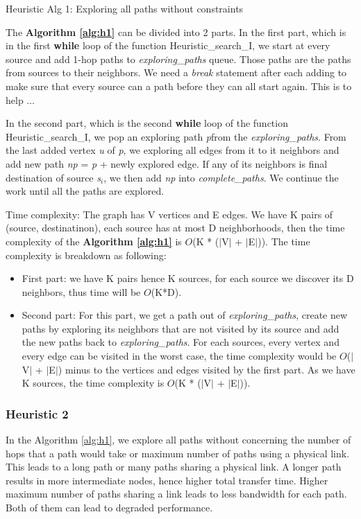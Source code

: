 \begin{algorithm}[!htp]
\caption{Heuristic Alg 1: Exploring all paths without constraints}
\label{alg:h1}

\end{algorithm}

The \textbf{Algorithm \ref{alg:h1}} can be divided into 2 parts. In the first part, which is in the first \textbf{while} loop of the function Heuristic\_search\_I, we start at every source and add 1-hop paths to \textit{exploring\_paths} queue. Those paths are the paths from sources to their neighbors. We need a \textit{break} statement after each adding to make sure that every source can a path before they can all start again. This is to help ...

In the second part, which is the second \textbf{while} loop of the function Heuristic\_search\_I, we pop an exploring path \textit{p}from the \textit{exploring\_paths}. From the last added vertex \textit{u} of \textit{p}, we exploring all edges from it to it neighbors and add new path \textit{np} = \textit{p} + newly explored edge. If any of its neighbors is final destination of source \textit{s$_i$}, we then add \textit{np} into \textit{complete\_paths}. We continue the work until all the paths are explored.

Time complexity: The graph has V vertices and E edges. We have K pairs of (source, destinatinon), each source has at most D neighborhoods, then the time complexity of the \textbf{Algorithm \ref{alg:h1}} is $O$(K * ($|$V$|$ + $|$E$|$)). The time complexity is breakdown as following:
\begin{itemize}
\item First part: we have K pairs hence K sources, for each source we discover its D neighbors, thus time will be $O$(K*D).
\item Second part: For this part, we get a path out of \textit{exploring\_paths}, create new paths by exploring its neighbors that are not visited by its source and add the new paths back to \textit{exploring\_paths}. For each sources, every vertex and every edge can be visited in the worst case, the time complexity would be $O$($|$V$|$ + $|$E$|$) minus to the vertices and edges visited by the first part. As we have K sources, the time complexity is $O$(K * ($|$V$|$ + $|$E$|$)).
\end{itemize}

\subsubsection{Heuristic 2}
In the Algorithm \ref{alg:h1}, we explore all paths without concerning the number of hops that a path would take or maximum number of paths using a physical link. This leads to a long path or many paths sharing a physical link. A longer path results in more intermediate nodes, hence higher total transfer time. Higher maximum number of paths sharing a link leads to less bandwidth for each path. Both of them can lead to degraded performance.

